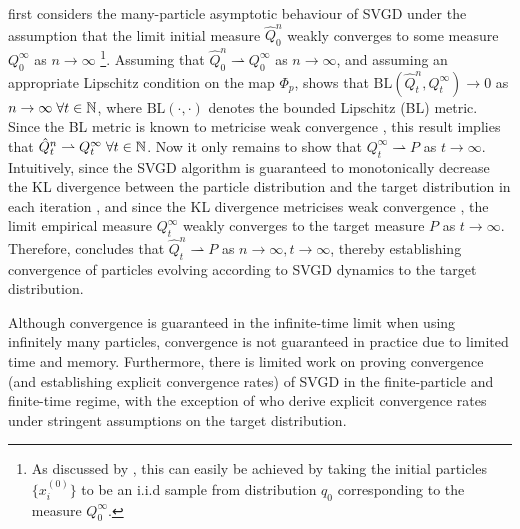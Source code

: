 \citet{liu_svgd_gf} first considers the many-particle asymptotic behaviour of SVGD under the assumption that the limit initial measure $\hat{Q}_0^n$ weakly converges to some measure $Q_0^\infty$ as $n \rightarrow \infty$ \footnote{As discussed by \citet{liu_svgd_gf}, this can easily be achieved by taking the initial particles $\{x_i^{(0)}\}$ to be an i.i.d sample from distribution $q_0$ corresponding to the measure $Q_0^{\infty}$.}. Assuming that $\hat{Q}_0^n \rightharpoonup Q_0^\infty$ as $n \rightarrow \infty$, and assuming an appropriate Lipschitz condition on the map $\Phi_p$, \citet{liu_svgd_gf} shows that $\text{BL}(\hat{Q}^n_t, Q_t^\infty) \rightarrow 0$ as $n \rightarrow \infty \hspace{0.1cm} \forall t \in \mathbb{N}$, where $\text{BL}(\cdot, \cdot)$ denotes the bounded Lipschitz (BL) metric. Since the BL metric is known to metricise weak convergence \citep[e.g.,][]{bl_weak_convergence, lunde_bl_weak}, this result implies that $\hat{Q}_t^n \rightharpoonup Q_t^\infty \hspace{0.1cm} \forall t \in \mathbb{N}$. Now it only remains to show that $Q_t^{\infty} \rightharpoonup P$ as $t \rightarrow \infty$. Intuitively, since the SVGD algorithm is guaranteed to monotonically decrease the KL divergence between the particle distribution and the target distribution in each iteration \citep[][Theorem 3.3(2)]{liu_svgd_gf}, and since the KL divergence metricises weak convergence \citep[e.g.,][]{walker_kl_weak,osti_kl_weak}, the limit empirical measure $Q_t^\infty$ weakly converges to the target measure $P$ as $t \rightarrow \infty$. Therefore, \citet{liu_svgd_gf} concludes that $\hat{Q}_t^n \rightharpoonup P$ as $n \rightarrow \infty, t \rightarrow \infty$, thereby establishing convergence of particles evolving according to SVGD dynamics to the target distribution.

Although convergence is guaranteed in the infinite-time limit when using infinitely many particles, convergence is not guaranteed in practice due to limited time and memory. Furthermore, there is limited work on proving convergence (and establishing explicit convergence rates) of SVGD in the finite-particle and finite-time regime, with the exception of \citet{shi_finite_convergence} who derive explicit convergence rates under stringent assumptions on the target distribution.





